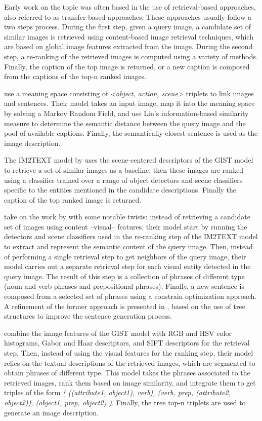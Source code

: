 Early work on the topic was often based in the use of retrieval-based approaches, also referred to as transfer-based approaches. These approaches usually follow a two steps process. During the first step, given a query image, a candidate set of similar images is retrieved using content-based image retrieval techniques, which are based on global image features extracted from the image. During the second step, a re-ranking of the retrieved images is computed using a variety of methods. Finally, the caption of the top image is returned, or a new caption is composed from the captions of the top-n ranked images.

\citet{Farhadi2010} use a meaning space consisting of \textit{<object, action, scene>} triplets to link images and sentences. Their model takes an input image, map it into the meaning space by solving a Markov Random Field, and use Lin's information-based similarity measure \citep{Lin1998} to determine the semantic distance between the query image and the pool of available captions. Finally, the semantically closest sentence is used as the image description.

The IM2TEXT model by \citet{Ordonez2011} uses the scene-centered descriptors of the GIST model \citep{Oliva2006, Torralba2008} to retrieve a set of similar images as a baseline, then these images are ranked using a classifier trained over a range of object detectors and scene classifiers specific to the entities mentioned in the candidate descriptions. Finally the caption of the top ranked image is returned. 

\citet{Kuznetsova2012} take on the work by \citet{Ordonez2011} with some notable twists: instead of retrieving a candidate set of images using content --visual-- features, their model start by running the detectors and scene classifiers used in the re-ranking step of the IM2TEXT model to extract and represent the semantic content of the query image. Then, instead of performing a single retrieval step to get neighbors of the query image, their model carries out a separate retrieval step for each visual entity detected in the query image. The result of this step is a collection of phrases of different type (noun and verb phrases and prepositional phrases). Finally, a new sentence is composed from a selected set of phrases using a constrain optimization approach. A refinement of the former approach is presented in \citet{Kuznetsova2014}, based on the use of tree structures to improve the sentence generation process.

\citet{Gupta2012} combine the image features of the GIST model with RGB and HSV color histograms, Gabor and Haar descriptors, and SIFT \citep{Lowe2004} descriptors for the retrieval step. Then, instead of using the visual features for the ranking step, their model relies on the textual descriptions of the retrieved images, which are segmented to obtain phrases of different type. This model takes the phrases associated to the retrieved images, rank them based on image similarity, and integrate them to get triples of the form \textit{( ((attribute1, object1), verb), (verb, prep, (attribute2, object2)), (object1, prep, object2) )}. Finally, the tree top-n triplets are used to generate an image description.

